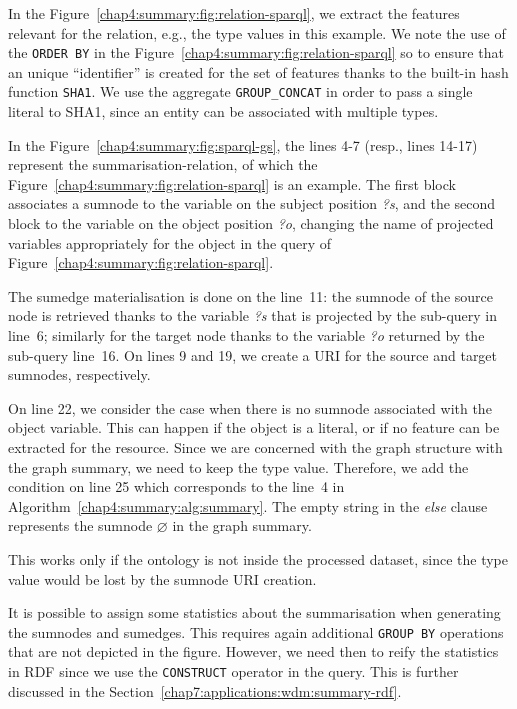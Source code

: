 
In the Figure~\ref{chap4:summary:fig:relation-sparql}, we extract the features relevant for the relation, e.g., the type values in this example. We note the use of the \texttt{ORDER BY} in the Figure~\ref{chap4:summary:fig:relation-sparql} so to ensure that an unique ``identifier'' is created for the set of features thanks to the built-in hash function \texttt{SHA1}. We use the aggregate \texttt{GROUP\_CONCAT} in order to pass a single literal to SHA1, since an entity can be associated with multiple types.


In the Figure~\ref{chap4:summary:fig:sparql-gs}, the lines 4-7 (resp., lines 14-17) represent the \gls{summarisation-relation}, of which the Figure~\ref{chap4:summary:fig:relation-sparql} is an example. The first block associates a sumnode to the variable on the subject position \emph{?s}, and the second block to the variable on the object position \emph{?o}, changing the name of projected variables appropriately for the object in the query of Figure~\ref{chap4:summary:fig:relation-sparql}.

The sumedge materialisation is done on the line~11: the sumnode of the source node is retrieved thanks to the variable \emph{?s} that is projected by the sub-query in line~6; similarly for the target node thanks to the variable \emph{?o} returned by the sub-query line~16.
On lines 9 and 19, we create a URI for the source and target sumnodes, respectively.

On line 22, we consider the case when there is no sumnode associated with the object variable. This can happen if the object is a literal, or if no feature can be extracted for the resource. Since we are concerned with the graph structure with the graph summary, we need to keep the type value. Therefore, we add the condition on line 25 which corresponds to the line~4 in Algorithm~\ref{chap4:summary:alg:summary}.
The empty string in the \emph{else} clause represents the sumnode $\varnothing$ in the graph summary.

\begin{remark}
This works only if the ontology is not inside the processed dataset, since the type value would be lost by the sumnode URI creation.
\end{remark}


It is possible to assign some statistics about the summarisation when generating the sumnodes and sumedges. This requires again additional \texttt{GROUP BY} operations that are not depicted in the figure. However, we need then to reify the statistics in RDF since we use the \texttt{CONSTRUCT} operator in the query. This is further discussed in the Section~\ref{chap7:applications:wdm:summary-rdf}.

